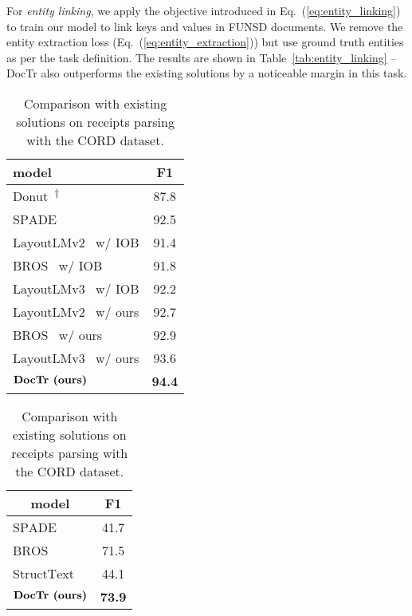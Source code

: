 For \textit{entity linking}, we apply the objective introduced in Eq.~(\ref{eq:entity_linking}) to train our model to link keys and values in FUNSD documents. We remove the entity extraction loss (Eq.~(\ref{eq:entity_extraction})) but use ground truth entities as per the task definition. The results are shown in Table~\ref{tab:entity_linking} -- DocTr also outperforms the existing solutions by a noticeable margin in this task.


\begin{table}[t]
\captionsetup{font=footnotesize}
\begin{minipage}{0.45\columnwidth}{
    \begin{center}
        \begin{tabular}{lc}
        \bf model & \bf F1 \\
        \midrule
        $\textrm{Donut}$~\cite{kim2022ocr}\textsuperscript{$\dagger$} & 87.8 \\
        $\textrm{SPADE}$~\cite{hwang2020spatial} & 92.5 \\
        \midrule
        $\textrm{LayoutLMv2}$~\cite{xu2021layoutlmv2} w/ IOB & 91.4 \\
        $\textrm{BROS}$~\cite{hong2021bros}  w/ IOB & 91.8 \\
        $\textrm{LayoutLMv3}$~\cite{huang2022layoutlmv3}  w/ IOB & 92.2 \\
        \midrule
        $\textrm{LayoutLMv2}$~\cite{xu2021layoutlmv2} w/ ours & 92.7 \\
        $\textrm{BROS}$~\cite{hong2021bros} w/ ours & 92.9 \\
        $\textrm{LayoutLMv3}$~\cite{huang2022layoutlmv3} w/ ours & 93.6 \\
        \midrule
        $\textrm{\bf DocTr (ours)}$ & \bf{94.4} \\
        \end{tabular}
    \vspace{-.5em}
    \caption{Comparison with existing solutions on receipts parsing with the CORD dataset.}
    \label{tab:receipts_parsing}
    \end{center}
}\end{minipage}
\hspace{1em}
\begin{minipage}{0.45\columnwidth}{
    \begin{center}
        \begin{tabular}{lc}
            \multicolumn{1}{c}{\bf model} & \bf F1 \\
            \midrule
            $\textrm{SPADE}$~\cite{hwang2020spatial}                  & 41.7  \\
            $\textrm{BROS}$~\cite{hong2021bros}                       & 71.5  \\
            $\textrm{StructText}$~\cite{li2021structext}              & 44.1  \\
            $\textrm{\bf DocTr (ours)}$                               & \bf 73.9  \\


\end{tabular}
\end{center}}
\end{minipage}
\end{table}
